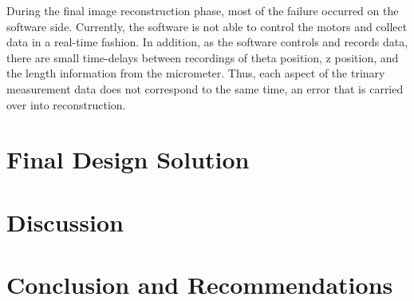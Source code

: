 \documentclass{article}
\begin{document}
	During the final image reconstruction phase, most of the failure occurred on the software side. Currently, the software is not able to control the motors and collect data in a real-time fashion. In addition, as the software controls and records data, there are small time-delays between recordings of theta position, z position, and the length information from the micrometer. Thus, each aspect of the trinary measurement data does not correspond to the same time, an error that is carried over into reconstruction. 







\section{Final Design Solution}
\label{sec:final-design-solut}

\section{Discussion}
\label{sec:discussion}

\section{Conclusion and Recommendations}
\label{sec:concl-recomm}

\newpage
{}


\end{document}
